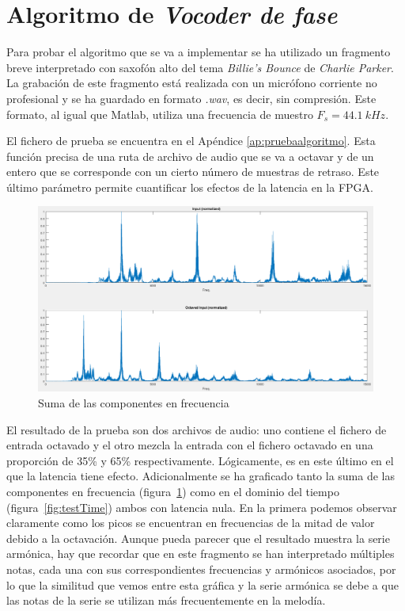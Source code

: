 \section{Algoritmo de \emph{Vocoder de fase}}

Para probar el algoritmo que se va a implementar se ha utilizado un fragmento breve interpretado con saxofón alto del tema \emph{Billie's Bounce} de \emph{Charlie Parker}. La grabación de este fragmento está realizada con un micrófono corriente no profesional y se ha guardado en formato \emph{.wav}, es decir, sin compresión. Este formato, al igual que Matlab, utiliza una frecuencia de muestro $F_{s} = 44.1~kHz$.

El fichero de prueba se encuentra en el Apéndice \ref{ap:pruebaalgoritmo}. Esta función precisa de una ruta de archivo de audio que se va a octavar y de un entero que se corresponde con un cierto número de muestras de retraso. Este último parámetro permite cuantificar los efectos de la latencia en la FPGA.

\begin{figure}[hbt]
\begin{center}
\includegraphics[width=15cm]{img/testAlFreq.png}
\caption{\label{fig:testFreq}Suma de las componentes en frecuencia}
\end{center}
\end{figure}

El resultado de la prueba son dos archivos de audio: uno contiene el fichero de entrada octavado y el otro mezcla la entrada con el fichero octavado en una proporción de 35\% y 65\% respectivamente. Lógicamente, es en este último en el que la latencia tiene efecto. Adicionalmente se ha graficado tanto la suma de las componentes en frecuencia (figura~\ref{fig:testFreq}) como en el dominio del tiempo (figura~\ref{fig:testTime}) ambos con latencia nula. En la primera podemos observar claramente como los picos se encuentran en frecuencias de la mitad de valor debido a la octavación. Aunque pueda parecer que el resultado muestra la serie armónica, hay que recordar que en este fragmento se han interpretado múltiples notas, cada una con sus correspondientes frecuencias y armónicos asociados, por lo que la similitud que vemos entre esta gráfica y la serie armónica se debe a que las notas de la serie se utilizan más frecuentemente en la melodía. 

